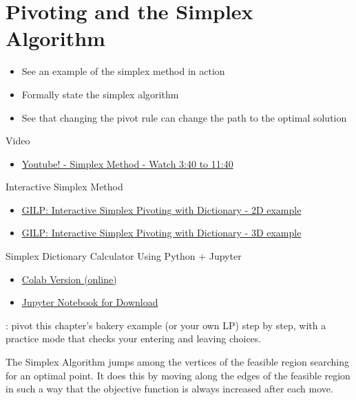 \section{Pivoting and the Simplex Algorithm}
\label{sec:pivoting}
\begin{outcome}
\begin{itemize}
\item See an example of the simplex method in action
\item Formally state the simplex algorithm
\item See that changing the pivot rule can change the path to the optimal solution
\end{itemize}
\end{outcome}
\begin{resource}
Video
\begin{itemize}
\item \href{https://youtu.be/E72DWgKP_1Y?si=LTPKmJpNy4zRX-7q&t=216}{Youtube! - Simplex Method - Watch 3:40 to 11:40} 
\end{itemize}
Interactive Simplex Method
\begin{itemize}
\item \href{https://gilp.henryrobbins.com/en/latest/examples/2d/ALL_INTEGER_2D_LP.html}{GILP: Interactive Simplex Pivoting with Dictionary - 2D example}
\item \href{https://gilp.henryrobbins.com/en/latest/examples/3d/ALL_INTEGER_3D_LP.html}{GILP: Interactive Simplex Pivoting with Dictionary - 3D example}
\end{itemize}
Simplex Dictionary Calculator Using Python + Jupyter
\begin{itemize}
\item \href{https://colab.research.google.com/drive/1kUWeNOVZByIoSWWUEUEFwwdFhAQvGcsG?usp=sharing}{Colab Version (online)}
\item \href{https://github.com/open-optimization/open-optimization-or-examples/blob/master/linear-programming/Simplex_Tableaus_From_Basis.ipynb}{Jupyter Notebook for Download}
\end{itemize}
\end{resource}
\begin{tryit}
: pivot this chapter's bakery example (or your own LP) step by step, with a practice mode that checks your entering and leaving choices.
\end{tryit}

The Simplex Algorithm jumps among the vertices of the feasible region searching for an optimal point.
It does this by moving along the edges of the feasible region in such a way that the objective function is always increased after each move.

